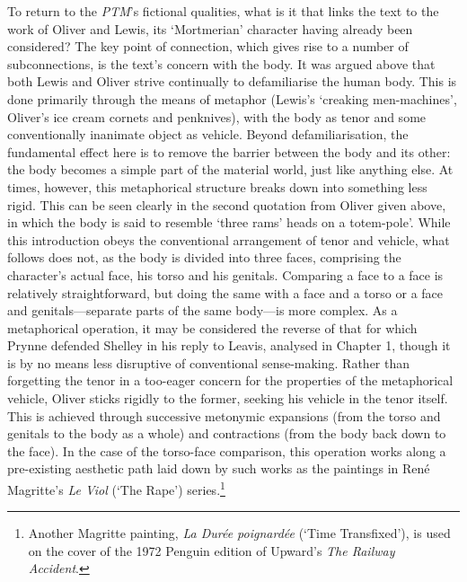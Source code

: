 \documentclass[]{article}
\begin{document}
To return to the \emph{PTM}'s fictional qualities, what is it that links
the text to the work of Oliver and Lewis, its `Mortmerian' character
having already been considered? The key point of connection, which gives
rise to a number of subconnections, is the text's concern with the body.
It was argued above that both Lewis and Oliver strive continually to
defamiliarise the human body. This is done primarily through the means
of metaphor (Lewis's `creaking men-machines', Oliver's ice cream cornets
and penknives), with the body as tenor and some conventionally inanimate
object as vehicle. Beyond defamiliarisation, the fundamental effect here
is to remove the barrier between the body and its other: the body
becomes a simple part of the material world, just like anything else. At
times, however, this metaphorical structure breaks down into something
less rigid. This can be seen clearly in the second quotation from Oliver
given above, in which the body is said to resemble `three rams' heads on
a totem-pole'. While this introduction obeys the conventional
arrangement of tenor and vehicle, what follows does not, as the body is
divided into three faces, comprising the character's actual face, his
torso and his genitals. Comparing a face to a face is relatively
straightforward, but doing the same with a face and a torso or a face
and genitals---separate parts of the same body---is more complex. As a
metaphorical operation, it may be considered the reverse of that for
which Prynne defended Shelley in his reply to Leavis, analysed in
Chapter 1, though it is by no means less disruptive of conventional
sense-making. Rather than forgetting the tenor in a too-eager concern
for the properties of the metaphorical vehicle, Oliver sticks rigidly to
the former, seeking his vehicle in the tenor itself. This is achieved
through successive metonymic expansions (from the torso and genitals to
the body as a whole) and contractions (from the body back down to the
face). In the case of the torso-face comparison, this operation works
along a pre-existing aesthetic path laid down by such works as the
paintings in René Magritte's \emph{Le Viol} (`The Rape')
series.\footnote{Another Magritte painting, \emph{La Durée poignardée}
  (`Time Transfixed'), is used on the cover of the 1972 Penguin edition
  of Upward's \emph{The Railway Accident}.}
\end{document}

